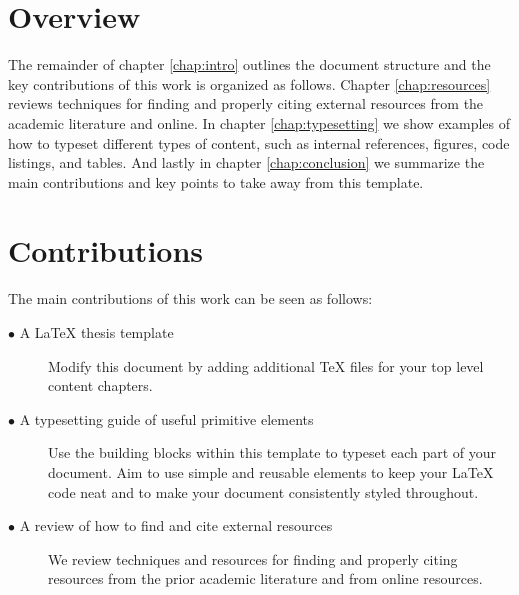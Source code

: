 \section{Overview}  
	\label{sec:intro_overview} 
	
The remainder of chapter \ref{chap:intro} outlines the document structure and the key contributions of this work is organized as follows. Chapter \ref{chap:resources} reviews techniques for finding and properly citing external resources from the academic literature and online. In chapter \ref{chap:typesetting} we show examples of how to typeset different types of content, such as internal references, figures, code listings, and tables. And lastly in chapter \ref{chap:conclusion} we summarize the main contributions and key points to take away from this template.

\section{Contributions} 
	\label{sec:intro_contribs} 
	
	The main contributions of this work can be seen as follows:
	
	\begin{description}	
	
		\item[$\bullet$ A LaTeX thesis template]\hfill
		
		Modify this document by adding additional TeX files for your top level content chapters. 
		
		\item[$\bullet$ A typesetting guide of useful primitive elements]\hfill
		
		Use the building blocks within this template to typeset each part of your document. Aim to use simple and reusable elements to keep your LaTeX code neat and to make your document consistently styled throughout.
		
		\item[$\bullet$ A review of how to find and cite external resources]\hfill
					
		We review techniques and resources for finding and properly citing resources from the prior academic literature and from online resources.
		
	\end{description}